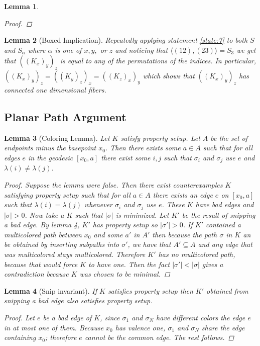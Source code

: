 \documentclass{article}
\newcommand{\sxyz}{((K_x)_y)_z}
\newcommand{\Sxyz}[3]{((K_#1)_#2)_#3}
\theoremstyle{mystyle}
\newtheorem{lem}{Lemma}[section]
\theoremstyle{remark}
\begin{document}
\begin{lem}
\begin{proof}
    \end{proof}

\end{lem}

\begin{lem}
    [Boxed Implication]
 \label{lem:boximp} 
    Repeatedly applying statement \ref{state:7} to both \(S\) and \(S_{\alpha}\) where \(\alpha\) is one of \(x,y,\) or \(z\)  and noticing that \(\langle (12),(23) \rangle = S_{3}\) we get that \(\sxyz\) is equal to any of the permutations of the indices. In particular, \(\Sxyz{x}{y}{z}=\Sxyz{y}{z}{x}=\Sxyz{z}{x}{y}\) which shows that \(\sxyz\) has connected one dimensional fibers.
\end{lem}
\subsection{Planar Path Argument}

 \label{lem:ppa} 
\begin{lem}[Coloring Lemma]
    \label{lem:coloring} 
    Let \(K\) satisfy property setup. Let \(A\) be the set of endpoints minus the basepoint \(x_{ 0}\). Then there exists some \(a \in A\) such that for all edges \(e\) in the geodesic \([x_{0} , a]\) there exist some \(i, j\) such that \(\sigma_{i}\) and \(\sigma_{j}\) use \(e\) and \(\lambda ( i ) \neq \lambda ( j )\).
    \begin{proof}
        Suppose the lemma were false. Then there exist counterexamples \(K\) satisfying property setup such that for all \(a \in A\) there exists an edge \(e\) on \([x_{0} , a]\) such that \(\lambda (i)= \lambda (j)\) whenever \(\sigma_{i}\) and \(\sigma_{j}\) use \(e\). These \(K\) have bad edges and \(| \sigma | > 0 \). Now take a \(K\) such that \(| \sigma |\) is minimized. Let \(K'\) be the result of snipping a bad edge. By lemma \ref{lem:preservesetup}, \(K'\) has property setup so \(| \sigma ' | > 0\). If \(K'\) contained a multicolored path between \(x_{0}\) and some \(a'\) in \(A'\) then because the path \(\sigma\) in \(K\) an be obtained by inserting subpaths into \(\sigma '\), we have that \(A' \subseteq A\) and any edge that was multicolored stays multicolored. Therefore \(K'\) has no multicolored path, because that would force \(K\) to have one. Then the fact \(| \sigma' | < | \sigma |\) gives a contradiction because \(K\) was chosen to be minimal. 
        
        
    
        
    \end{proof}
\end{lem}


\begin{lem}
    [Snip invariant]
 \label{lem:preservesetup} 
    If \(K\) satisfies property setup then \(K'\) obtained from snipping a bad edge also satisfies property setup.
    \begin{proof}
        Let \(e\) be a bad edge of \(K\), since \(\sigma_{1}\) and \(\sigma_{N}\) have different colors the edge \(e\) in at most one of them. Because \(x_{0}\) has valence one, \(\sigma_{1}\) and \(\sigma_{N}\) share the edge containing \(x_{0}\); therefore \(e\) cannot be the common edge. The rest follows.
    \end{proof}
\end{lem}
\end{document}
